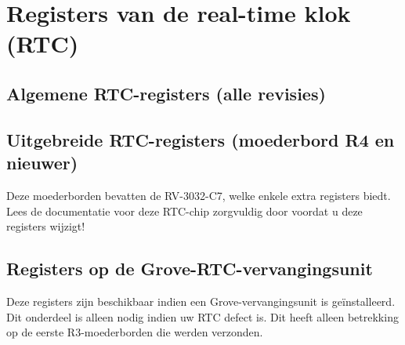 \chapter{Registers van de real-time klok (RTC)}

\section{Algemene RTC-registers (alle revisies)}


\section{Uitgebreide RTC-registers (moederbord R4 en nieuwer)}Deze moederborden bevatten de RV-3032-C7, welke enkele extra registers biedt. Lees de documentatie voor deze RTC-chip zorgvuldig door voordat u deze registers wijzigt!



\section{Registers op de Grove-RTC-vervangingsunit}Deze registers zijn beschikbaar indien een Grove-vervangingsunit is geïnstalleerd. Dit onderdeel is alleen nodig indien uw RTC defect is. Dit heeft alleen betrekking op de eerste R3-moederborden die werden verzonden.






